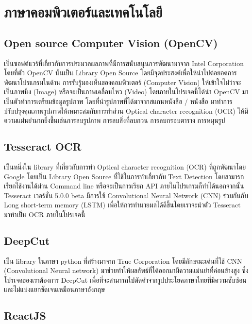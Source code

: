 \section{ภาษาคอมพิวเตอร์และเทคโนโลยี }

\subsection{Open source Computer Vision (OpenCV)}

เป็นซอฟต์แวร์ที่เกี่ยวกับการประมวลผลภาพที่มีการสนับสนุนการพัฒนามาจาก Intel Corporation โดยที่ตัว OpenCV นั้นเป็น Library Open Source  โดยมีจุดประสงค์เพื่อให้นำไปต่อยอดการพัฒนาโปรแกรมในด้าน การรับรู้มองเห็นของคอมพิวเตอร์ (Computer Vision) ให้เข้าใจไม่ว่าจะเป็นภาพนิ่ง (Image) หรือจะเป็นภาพเคลื่อนไหว (Video) โดยภายในโปรเจคนี้ได้นำ OpenCV มาเป็นตัวทำการเตรียมข้อมูลรูปภาพ โดยที่นำรูปภาพที่ได้มาจากสแกนหนังสือ / หนังสือ มาทำการปรับปรุงคุณภาพรูปภาพให้เหมาะสมกับการทำส่วน Optical character recognition (OCR) ให้มีความแม่นยำมากยิ่งขึ้นเช่นการลบรูปภาพ การลบสิ่งที่ลบกวน การลบกรอบตาราง การหมุนรูป 

\subsection{Tesseract OCR}

เป็นหนึ่งใน library ที่เกี่ยวกับการทำ Optical character recognition (OCR) ที่ถูกพัฒนาโดย Google โดยเป็น Library Open Source ที่ใช้ในการทำเกี่ยวกับ Text Detection โดยสามารถเรียกใช้งานได้ผ่าน Command line หรือจะเป็นการเรียก API ภายในโปรเกรมก็ทำได้นอกจากนั้น Tesseract เวอร์ชั่น 5.0.0 beta มีการใช้ Convolutional Neural Network (CNN) \cite{keiron} ร่วมกันกับ Long short-term memory (LSTM) เพื่อให้การทำนายผลได้ดีขึ้นโดยเราจะนำตัว Tesseract มาทำเป็น OCR ภายในโปรเจคนี้

\subsection{DeepCut}

เป็น library ในภาษา python ที่สร้างมาจาก True Corporation โดยมีลักษณะเด่นที่ใช้ CNN (Convolutional Neural network) \cite{keiron} มาช่วยทำให้ผลลัพธ์ที่ได้ออกมามีความแม่นยำที่ค่อนข้างสูง  ซึ่งโปรเจคของเราต้องการ DeepCut เพื่อที่จะสามารถไปตัดคำจากรูปประโยคภาษาไทยที่มีความซับซ้อน และไม่แบ่งแยกชัดเจนเหมือนภาษาอังกฤษ 

\subsection{ReactJS}


